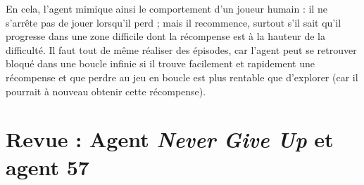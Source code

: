 \documentclass[a4paper,12pt]{report}
\begin{document}
\newline En cela, l'agent mimique ainsi le comportement d'un joueur humain : il ne s'arrête pas de jouer lorsqu’il perd ; mais il recommence, surtout s’il sait qu’il progresse dans une zone difficile dont la récompense est à la hauteur de la difficulté.
\newline Il faut tout de même réaliser des épisodes, car l’agent peut se retrouver bloqué dans une boucle infinie si il trouve facilement et rapidement une récompense et que perdre au jeu en boucle est plus rentable que d'explorer (car il pourrait à nouveau obtenir cette récompense).

\newpage \section{Revue : Agent \textit{Never Give Up} \cite{ngu} et agent 57 \cite{agent57}}
\end{document}

